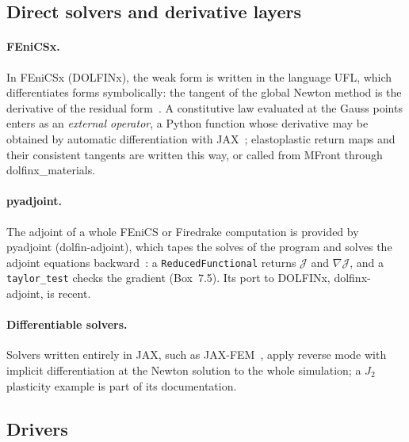 \subsection{Direct solvers and derivative layers}
%
\paragraph{FEniCSx.}
In FEniCSx (DOLFINx), the weak form is written in the language UFL, which
differentiates forms symbolically: the tangent of the global Newton method is
the derivative of the residual form~\cite{AlnaesEtAl2014}. A constitutive law
evaluated at the Gauss points enters as an \emph{external operator}, a Python
function whose derivative may be obtained by automatic differentiation with
JAX~\cite{LatyshevEtAl2025}; elastoplastic return maps and their consistent
tangents are written this way, or called from MFront through dolfinx\_materials.

\paragraph{pyadjoint.}
The adjoint of a whole FEniCS or Firedrake computation is provided by pyadjoint
(dolfin-adjoint), which tapes the solves of the program and solves the adjoint
equations backward~\cite{FarrellEtAl2013,MituschFunkeDokken2019}: a
\texttt{ReducedFunctional} returns $\mathcal J$ and $\nabla\mathcal J$, and a
\texttt{taylor\_test} checks the gradient (Box~7.5). Its port to DOLFINx,
dolfinx-adjoint, is recent.

\paragraph{Differentiable solvers.}
Solvers written entirely in JAX, such as JAX-FEM~\cite{XueEtAl2023}, apply
reverse mode with implicit differentiation at the Newton solution to the whole
simulation; a $J_2$ plasticity example is part of its documentation.

\subsection{Drivers}
%
